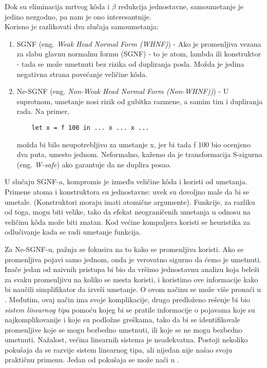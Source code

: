 Dok su eliminacija mrtvog k\^{o}da i $\beta$ redukcija jednostavne, samoumetanje je jedino nezgodno, pa nam je ono interesantnije. \\

Korisno je razlikovati dva slučaja samoumetanja:
\begin{enumerate}
	\item SGNF (eng. \emph{Weak Head Normal Form (WHNF)}) - Ako je promenljiva vezana za slabu glavnu normalnu formu (SGNF) - to 
	je atom, lambda ili konstruktor - tada se može umetnuti bez rizika od dupliranja posla. Možda je jedina negativna strana povećanje veličine k\^{o}da.
	\item Ne-SGNF (eng. \emph{Non-Weak Head Normal Form (Non-WHNF))}) - U suprotnom, umetanje nosi rizik od gubitka razmene, a samim tim i dupliranja rada. Na primer,
	\begin{verbatim}
	let x = f 100 in ... x ... x ... 
	\end{verbatim}
	možda bi bilo neupotrebljivo za umetanje x, jer bi tada f 100 bio ocenjeno dva puta, umesto jednom. Neformalno, kažemo da je transformacija S-sigurna (eng. \emph{W-safe}) ako garantuje da ne duplira posao.
\end{enumerate}

U slučaju SGNF-a, kompromis je između veličine k\^{o}da i koristi od umetanja. Primene atoma i konstruktora su jednostavne: uvek su dovoljno male da bi se umetale. (Konstruktori moraju imati atomične argumente). Funkcije, za razliku od toga, mogu biti velike, tako da efekat neograničenih umetanja u odnosu na veličinu k\^{o}da može biti znatan. Kod većine kompaljera koristi se heuristika za odlučivanje kada se radi umetanje funkcija.

Za Ne-SGNF-u, pažnja se fokusira na to kako se promenljiva koristi. Ako se promenljiva pojavi samo jednom, onda je verovatno sigurno da ćemo je umetnuti. Inače jedan od naivnih pristupa bi bio da vršimo jednostavnu analizu koja beleži za svaku promenljivu na koliko se mesta koristi, i koristimo ove informacije kako bi naučili simplifikator da izvrši umetanje. O ovom načinu se može više pronaći u \cite{appel}. Međutim, ovaj način ima svoje komplikacije, drugo predloženo rešenje bi bio \textit{sistem linearnog tipa} \cite{turner} pomoću kojeg bi se pratile informacije o pojavama koje su najkomplikovanije i koje su podložne greškama, tako da bi se identifikovale promenljive koje se mogu bezbedno umetnuti, ili koje se ne mogu bezbedno umetnuti. Nažalost, većina linearnih sistema je neadekvatna. Postoji nekoliko pokušaja da se razvije sistem linearnog tipa, ali nijedan nije našao svoju praktičnu primenu. Jedan od pokušaja se može naći u \cite{transformation-based-optimiser-Haskell}. 

